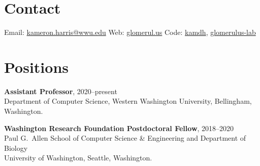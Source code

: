 \documentclass[margin,line]{res}
\begin{document}

\begin{resume}

  \section{\sc Contact}
  Email: \href{mailto:kameron.harris@wwu.edu}{kameron.harris@wwu.edu}\quad
  Web: \href{http://glomerul.us}{glomerul.us}\quad
  Code:
  \href{https://github.com/kamdh/}{kamdh},
  \href{https://github.com/glomerulus-lab}{glomerulus-lab}

  \section{\sc Positions}

  {\bf Assistant Professor},
  2020--present\\
  Department of Computer Science,
  Western Washington University, Bellingham, Washington.

  {\bf Washington Research Foundation Postdoctoral Fellow},  
  2018--2020\\
  Paul G.\ Allen School of Computer Science \& Engineering and
  Department of Biology\\
  University of Washington, Seattle, Washington.




\end{resume}
\end{document}
